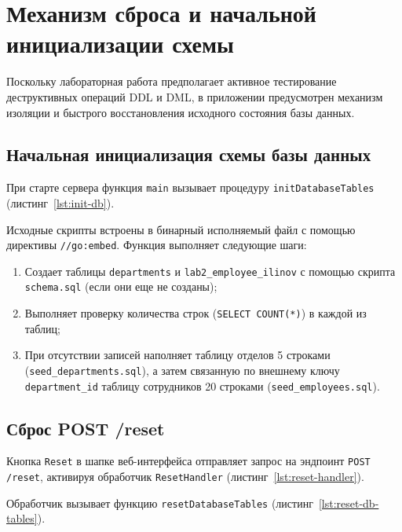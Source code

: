 \section{Механизм сброса и начальной инициализации схемы}
\label{sec:reset}

Поскольку лабораторная работа предполагает активное тестирование деструктивных операций DDL и DML, в приложении предусмотрен механизм изоляции и быстрого восстановления исходного состояния базы данных.

\subsection{Начальная инициализация схемы базы данных}

При старте сервера функция \texttt{main} вызывает процедуру \texttt{initDatabaseTables} (листинг~\ref{lst:init-db}).

\begin{listing}[H]
    \caption{Инициализация таблиц и первичное наполнение данными в \texttt{db.go}}
    \label{lst:init-db}
\end{listing}

Исходные скрипты встроены в бинарный исполняемый файл с помощью директивы \texttt{//go:embed}. Функция выполняет следующие шаги:
\begin{enumerate}
    \item Создает таблицы \texttt{departments} и \texttt{lab2\_employee\_ilinov} с помощью скрипта \texttt{schema.sql} (если они еще не созданы);
    \item Выполняет проверку количества строк (\texttt{SELECT COUNT(*)}) в каждой из таблиц;
    \item При отсутствии записей наполняет таблицу отделов 5 строками (\texttt{seed\_departments.sql}), а затем связанную по внешнему ключу \texttt{department\_id} таблицу сотрудников 20 строками (\texttt{seed\_employees.sql}).
\end{enumerate}

\subsection{Сброс POST /reset}

Кнопка \texttt{Reset} в шапке веб-интерфейса отправляет запрос на эндпоинт \texttt{POST /reset}, активируя обработчик \texttt{ResetHandler} (листинг~\ref{lst:reset-handler}).

\begin{listing}[H]
    \caption{Обработчик сброса базы данных в \texttt{handlers\_tables.go}}
    \label{lst:reset-handler}
\end{listing}

Обработчик вызывает функцию \texttt{resetDatabaseTables} (листинг~\ref{lst:reset-db-tables}).

\begin{listing}[H]
    \caption{Каскадное удаление всех таблиц и повторная инициализация}
    \label{lst:reset-db-tables}
\end{listing}
